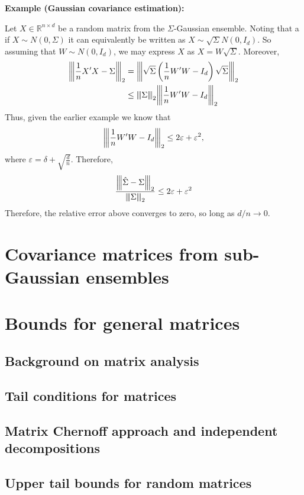 \documentclass[10pt,handout,english]{beamer}
\newcommand{\R}{\mathbb{R}}
\newcommand{\vertiii}[1]{{\left\vert\kern-0.25ex\left\vert\kern-0.25ex\left\vert #1 
    \right\vert\kern-0.25ex\right\vert\kern-0.25ex\right\vert}}
\begin{document}
\begin{frame}[allowframebreaks]
\textbf{Example (Gaussian covariance estimation):} 

Let $X\in\R^{n\times d}$ be a random matrix from the $\Sigma$-Gaussian ensemble. Noting that a if $X\sim N(0,\Sigma)$ it can equivalently be written as $X\sim\sqrt{\Sigma} N(0,I_d)$. So assuming that $W\sim N(0,I_d)$, we may express $X$ as $X=W\sqrt{\Sigma}$. Moreover, 
\begin{align*}
\vertiii{\frac{1}{n}X'X-\Sigma}_2&=\vertiii{\sqrt{\Sigma}\left(\frac{1}{n}W'W-I_d\right)\sqrt{\Sigma}}_2\\
&\leq\vertiii{\Sigma}_2\vertiii{\frac{1}{n}W'W-I_d}_2
\end{align*}
Thus, given the earlier example we know that
\[
\vertiii{\frac{1}{n}W'W-I_d}_2\leq2\varepsilon+\varepsilon^2,
\]
where $\varepsilon=\delta+\sqrt{\frac{d}{n}}$. Therefore, 
\[
\frac{\vertiii{\hat{\Sigma}-\Sigma}_2}{\vertiii{\Sigma}_2}\leq 2\varepsilon+\varepsilon^2
\]
Therefore, the relative error above converges to zero, so long as $d/n\to 0$.
\end{frame}

\section{Covariance matrices from sub-Gaussian ensembles}
\frame{\tableofcontents[currentsection]}

\section{Bounds for general matrices}
\subsection{Background on matrix analysis}


\subsection{Tail conditions for matrices}


\subsection{Matrix Chernoff approach and independent decompositions}


\subsection{Upper tail bounds for random matrices}
\end{document}
